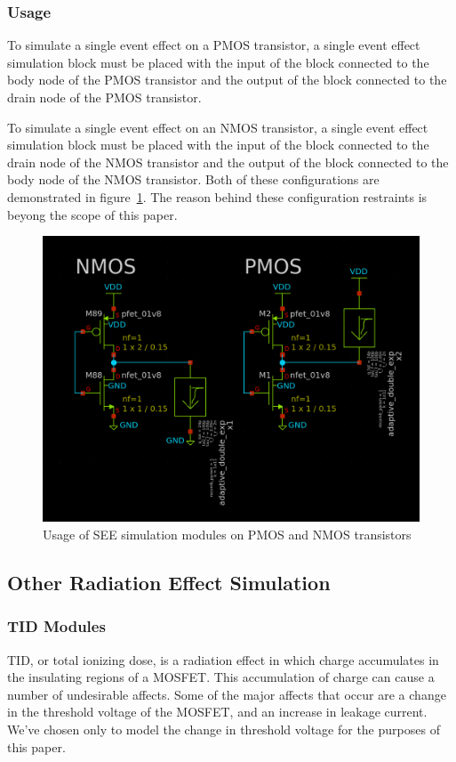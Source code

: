 \documentclass[conference]{IEEEtran}
\begin{document}
    \subsubsection{Usage}
    To simulate a single event effect on a PMOS transistor, a single event effect simulation block must be placed with the input of the block connected to the body node of the PMOS transistor and the output of the block connected to the drain node of the PMOS transistor.

    To simulate a single event effect on an NMOS transistor, a single event effect simulation block must be placed with the input of the block connected to the drain node of the NMOS transistor and the output of the block connected to the body node of the NMOS transistor. 
    Both of these configurations are demonstrated in figure~\ref{fig:SEE_Usage}. The reason behind these configuration restraints is beyong the scope of this paper.

    \begin{figure}[htbp]
        \centering
        \includegraphics[width=0.9\linewidth]{PMOS_NMOS_Usage}
        \caption{Usage of SEE simulation modules on PMOS and NMOS transistors}
        \label{fig:SEE_Usage}
    \end{figure}


    \subsection{Other Radiation Effect Simulation}
    \label{subsec:other-radiation-effect-simulation}

    \subsubsection{TID Modules}
    TID, or total ionizing dose, is a radiation effect in which charge accumulates in the insulating regions of a MOSFET. This accumulation of charge can cause a number of undesirable affects.
    Some of the major affects that occur are a change in the threshold voltage of the MOSFET, and an increase in leakage current.
    We've chosen only to model the change in threshold voltage for the purposes of this paper.
\end{document}
